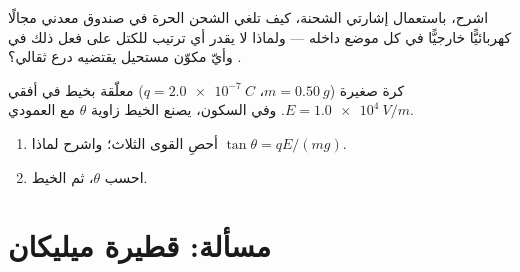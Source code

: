 \begin{exercise}[$\star\star\star$]\label{exo:g11:electric-gravitational-fields:14}
اشرح، باستعمال إشارتي الشحنة، كيف تلغي الشحن الحرة في صندوق
معدني مجالًا كهربائيًّا خارجيًّا في كل موضع داخله --- ولماذا لا يقدر
أي ترتيب للكتل على فعل ذلك في . وأيّ مكوّن مستحيل يقتضيه درع
ثقالي؟
\end{exercise}

\begin{exercise}[$\star\star\star$]\label{exo:g11:electric-gravitational-fields:15}
كرة صغيرة ($m = \qty{0.50}{g}$، $q = \qty{+2.0e-7}{C}$) معلّقة بخيط
في  أفقي $E = \qty{1.0e4}{V/m}$. وفي السكون،
يصنع الخيط زاوية $\theta$ مع العمودي.
\begin{enumerate}
  \item أحصِ القوى الثلاث؛ واشرح لماذا $\tan\theta = qE / (mg)$.
  \item احسب $\theta$، ثم  الخيط.
\end{enumerate}
\end{exercise}

\section{مسألة: قطيرة ميليكان}

